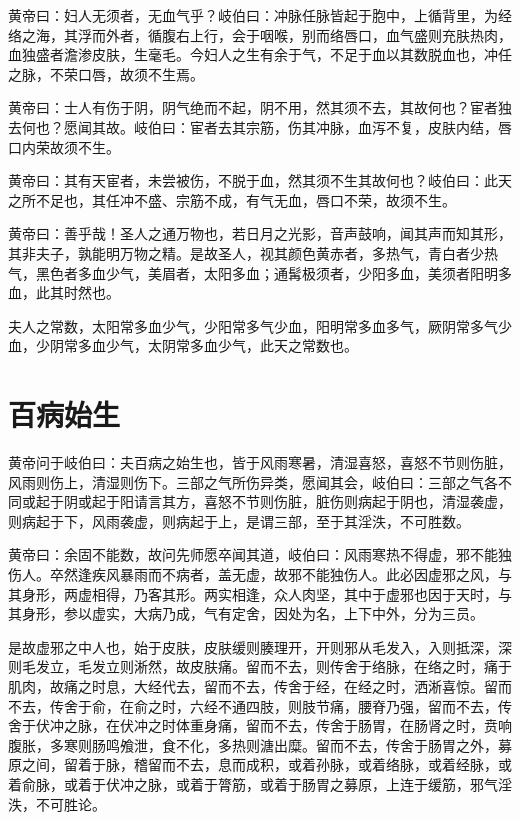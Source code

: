 \documentclass[a4paper,12pt,UTF8,twoside]{ctexbook}
\begin{document}
	黄帝曰：妇人无须者，无血气乎？岐伯曰：冲脉任脉皆起于胞中，上循背里，为经络之海，其浮而外者，循腹右上行，会于咽喉，别而络唇口，血气盛则充肤热肉，血独盛者澹渗皮肤，生毫毛。今妇人之生有余于气，不足于血以其数脱血也，冲任之脉，不荣口唇，故须不生焉。
	
	黄帝曰：士人有伤于阴，阴气绝而不起，阴不用，然其须不去，其故何也？宦者独去何也？愿闻其故。岐伯曰：宦者去其宗筋，伤其冲脉，血泻不复，皮肤内结，唇口内荣故须不生。
	
	黄帝曰：其有天宦者，未尝被伤，不脱于血，然其须不生其故何也？岐伯曰：此天之所不足也，其任冲不盛、宗筋不成，有气无血，唇口不荣，故须不生。
	
	黄帝曰：善乎哉！圣人之通万物也，若日月之光影，音声鼓响，闻其声而知其形，其非夫子，孰能明万物之精。是故圣人，视其颜色黄赤者，多热气，青白者少热气，黑色者多血少气，美眉者，太阳多血；通髯极须者，少阳多血，美须者阳明多血，此其时然也。
	
	夫人之常数，太阳常多血少气，少阳常多气少血，阳明常多血多气，厥阴常多气少血，少阴常多血少气，太阴常多血少气，此天之常数也。
	
	\chapter{百病始生}
	
	黄帝问于岐伯曰：夫百病之始生也，皆于风雨寒暑，清湿喜怒，喜怒不节则伤脏，风雨则伤上，清湿则伤下。三部之气所伤异类，愿闻其会，岐伯曰：三部之气各不同或起于阴或起于阳请言其方，喜怒不节则伤脏，脏伤则病起于阴也，清湿袭虚，则病起于下，风雨袭虚，则病起于上，是谓三部，至于其淫泆，不可胜数。
	
	黄帝曰：余固不能数，故问先师愿卒闻其道，岐伯曰：风雨寒热不得虚，邪不能独伤人。卒然逢疾风暴雨而不病者，盖无虚，故邪不能独伤人。此必因虚邪之风，与其身形，两虚相得，乃客其形。两实相逢，众人肉坚，其中于虚邪也因于天时，与其身形，参以虚实，大病乃成，气有定舍，因处为名，上下中外，分为三员。
	
	是故虚邪之中人也，始于皮肤，皮肤缓则腠理开，开则邪从毛发入，入则抵深，深则毛发立，毛发立则淅然，故皮肤痛。留而不去，则传舍于络脉，在络之时，痛于肌肉，故痛之时息，大经代去，留而不去，传舍于经，在经之时，洒淅喜惊。留而不去，传舍于俞，在俞之时，六经不通四肢，则肢节痛，腰脊乃强，留而不去，传舍于伏冲之脉，在伏冲之时体重身痛，留而不去，传舍于肠胃，在肠肾之时，贲响腹胀，多寒则肠鸣飧泄，食不化，多热则溏出糜。留而不去，传舍于肠胃之外，募原之间，留着于脉，稽留而不去，息而成积，或着孙脉，或着络脉，或着经脉，或着俞脉，或着于伏冲之脉，或着于膂筋，或着于肠胃之募原，上连于缓筋，邪气淫泆，不可胜论。
	
\end{document}
